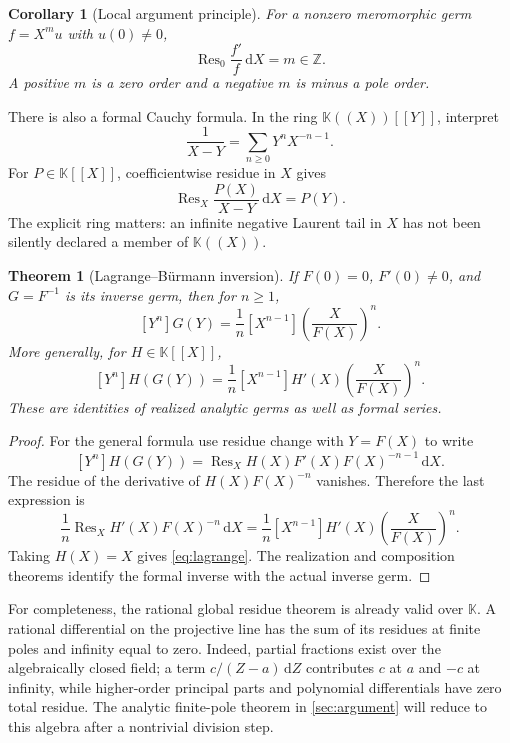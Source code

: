 \documentclass[11pt,letterpaper]{article}
\numberwithin{equation}{section}
\newtheorem{theorem}{Theorem}[section]
\newtheorem{corollary}[corollary]{Corollary}
\theoremstyle{definition}
\theoremstyle{remark}
\newcommand{\K}{\mathbb K}
\newcommand{\Z}{\mathbb Z}
\newcommand{\dd}{\,\mathrm d}
\DeclareMathOperator{\Res}{Res}
\begin{document}
\begin{corollary}[Local argument principle]
For a nonzero meromorphic germ $f=X^m u$ with $u(0)\ne0$,
\[
 \Res_0\frac{f'}f\dd X=m\in\Z.
\]
A positive $m$ is a zero order and a negative $m$ is minus a pole order.
\end{corollary}

There is also a formal Cauchy formula. In the ring
$\K((X))[[Y]]$, interpret
\[
 \frac1{X-Y}=\sum_{n\ge0}Y^nX^{-n-1}.
\]
For $P\in\K[[X]]$, coefficientwise residue in $X$ gives
\begin{equation}\label{eq:formalCauchy}
 \Res_X\frac{P(X)}{X-Y}\dd X=P(Y).
\end{equation}
The explicit ring matters: an infinite negative Laurent tail in $X$ has
not been silently declared a member of $\K((X))$.

\begin{theorem}[Lagrange--B\"urmann inversion]\label{thm:lagrange}
If $F(0)=0$, $F'(0)\ne0$, and $G=F^{-1}$ is its inverse germ, then
for $n\ge1$,
\begin{equation}\label{eq:lagrange}
 [Y^n]G(Y)=\frac1n[X^{n-1}]\left(\frac{X}{F(X)}\right)^n.
\end{equation}
More generally, for $H\in\K[[X]]$,
\[
 [Y^n]H(G(Y))=\frac1n[X^{n-1}]H'(X)
                       \left(\frac{X}{F(X)}\right)^n.
\]
These are identities of realized analytic germs as well as formal series.
\end{theorem}
\begin{proof}
For the general formula use residue change with $Y=F(X)$ to write
\[
 [Y^n]H(G(Y))=\Res_X H(X)F'(X)F(X)^{-n-1}\dd X.
\]
The residue of the derivative of $H(X)F(X)^{-n}$ vanishes. Therefore the
last expression is
\[
 \frac1n\Res_X H'(X)F(X)^{-n}\dd X
 =\frac1n[X^{n-1}]H'(X)\left(\frac X{F(X)}\right)^n.
\]
Taking $H(X)=X$ gives \eqref{eq:lagrange}. The realization and composition
theorems identify the formal inverse with the actual inverse germ.
\end{proof}

For completeness, the rational global residue theorem is already valid
over $\K$. A rational differential on the projective line has the sum of
its residues at finite poles and infinity equal to zero. Indeed, partial
fractions exist over the algebraically closed field; a term
$c/(Z-a)\dd Z$ contributes $c$ at $a$ and $-c$ at infinity, while
higher-order principal parts and polynomial differentials have zero total
residue. The analytic finite-pole theorem in \cref{sec:argument} will
reduce to this algebra after a nontrivial division step.
\end{document}
